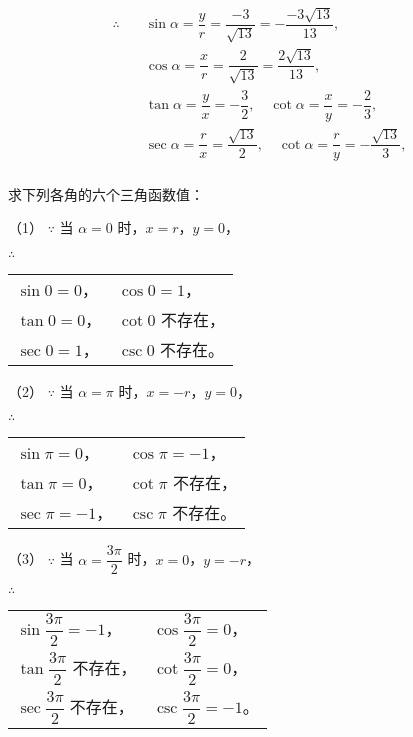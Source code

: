 \begin{minipage}{7.7cm}
\begin{align*}
    \therefore \quad & \sin \alpha = \dfrac y r = \dfrac{-3}{\sqrt{13}} = -\dfrac{-3\sqrt{13}}{13}, \\
        & \cos \alpha = \dfrac x r = \dfrac{2}{\sqrt{13}} = \dfrac{2\sqrt{13}}{13}, \\
        & \tan \alpha = \dfrac y x = -\dfrac 3 2, \quad \cot \alpha = \dfrac x y = -\dfrac 2 3, \\
        & \sec \alpha = \dfrac r x = \dfrac{\sqrt{13}}{2}, \quad \cot \alpha = \dfrac r y = -\dfrac{\sqrt{13}}{3}, \\
\end{align*}
\end{minipage}

\liti 求下列各角的六个三角函数值：
\begin{xiaoxiaotis}


\end{xiaoxiaotis}

\jie （1） $\because$ 当 $\alpha = 0$ 时，$x = r$，$y = 0$，

$\therefore$
\begin{tabular}[t]{p{8em}p{8em}}
    $\sin 0 = 0$， & $\cos 0 = 1$，\\
    $\tan 0 = 0$， & $\cot 0$ 不存在，\\
    $\sec 0 = 1$， & $\csc 0$ 不存在。
\end{tabular}

（2） $\because$ 当 $\alpha = \pi$ 时，$x = -r$，$y = 0$，

$\therefore$
\begin{tabular}[t]{p{8em}p{8em}}
    $\sin \pi = 0$， & $\cos \pi = -1$，\\
    $\tan \pi = 0$， & $\cot \pi$ 不存在，\\
    $\sec \pi = -1$， & $\csc \pi$ 不存在。
\end{tabular}

（3） $\because$ 当 $\alpha = \dfrac{3\pi}{2}$ 时，$x = 0$，$y = -r$，

$\therefore$
\begin{tabular}[t]{p{8em}p{8em}}
    $\sin \dfrac{3\pi}{2} = -1$， & $\cos \dfrac{3\pi}{2} = 0$，\\
    \rule{0pt}{2em} $\tan \dfrac{3\pi}{2}$ 不存在， & $\cot \dfrac{3\pi}{2} = 0$，\\
    \rule{0pt}{2em} $\sec \dfrac{3\pi}{2}$ 不存在， & $\csc \dfrac{3\pi}{2} = -1$。
\end{tabular}

